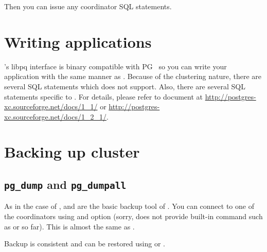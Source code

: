   Then you can issue any coordinator \XC{} SQL statements.


%
%
\chapter{Writing applications}

  \XC's libpq interface is binary compatible with PG~ so you can write your application with
  the same manner as \PG.
  Because of the clustering nature, there are several SQL statements which \XC{} does not support.
  Also, there are several SQL statements specific to \XC.
  For details, please refer to \XC{} document at \url{http://postgres-xc.sourceforge.net/docs/1_1/}
  or \url{http://postgres-xc.sourceforge.net/docs/1_2_1/}.


%
%
\chapter{\label{pgxcCtl:bkup}Backing up \XC{} cluster}



\section{\texttt{pg\_dump} and \texttt{pg\_dumpall}}

  As in the case of \PG,  and  are the basic backup tool of \XC.
  You can connect to one of the coordinators using  and  option (sorry,
   does not provide built-in command such as  or  so far).
  This is almost the same as \PG.

  Backup is consistent and can be restored using  or .



